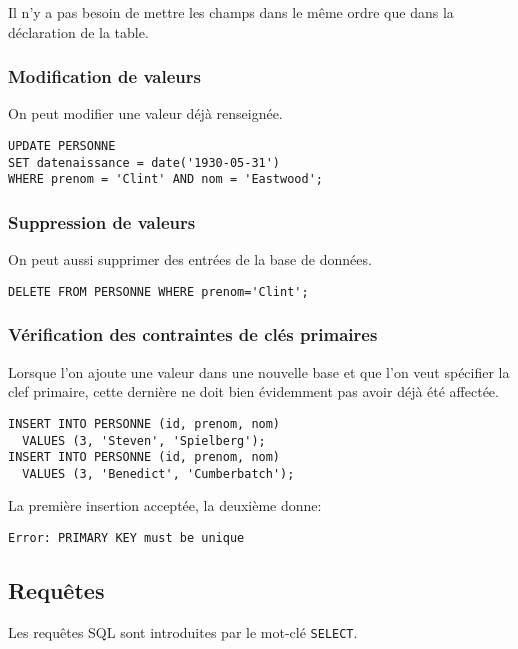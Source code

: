 \begin{rem}
  Il n'y a pas besoin de mettre les champs dans le même ordre que dans la
déclaration de la table.
\end{rem}
 


\subsubsection{Modification de valeurs}
On peut modifier une valeur déjà renseignée. 
\begin{lstlisting}
UPDATE PERSONNE
SET datenaissance = date('1930-05-31')
WHERE prenom = 'Clint' AND nom = 'Eastwood';
\end{lstlisting}

\subsubsection{Suppression de valeurs}
On peut aussi supprimer des entrées de la base de données. 
\begin{lstlisting}
DELETE FROM PERSONNE WHERE prenom='Clint';
\end{lstlisting}

\subsubsection{Vérification des contraintes de clés primaires}
Lorsque l'on ajoute une valeur dans une nouvelle base et que l'on veut spécifier la clef primaire, cette dernière ne doit bien évidemment pas avoir déjà été affectée. 
\begin{lstlisting}
INSERT INTO PERSONNE (id, prenom, nom)
  VALUES (3, 'Steven', 'Spielberg');
INSERT INTO PERSONNE (id, prenom, nom)
  VALUES (3, 'Benedict', 'Cumberbatch');
\end{lstlisting}
La première insertion acceptée, la deuxième donne:
\begin{Verbatim}
Error: PRIMARY KEY must be unique
\end{Verbatim}

\subsection{Requêtes}

Les requêtes SQL sont introduites par le mot-clé \texttt{SELECT}.

